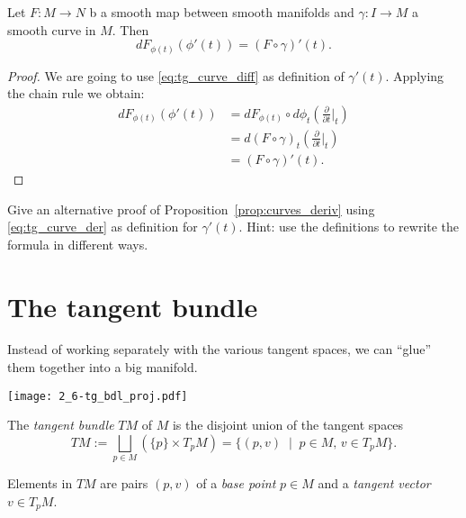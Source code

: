 \begin{proposition}\label{prop:curves_deriv}
  Let $F:M\to N$ b a smooth map between smooth manifolds and $\gamma:I\to M$ a smooth curve in $M$.
  Then
  \begin{equation}
    d F_{\phi(t)} (\phi'(t)) = (F\circ\gamma)'(t).
  \end{equation}
\end{proposition}
\begin{proof}
  We are going to use \eqref{eq:tg_curve_diff} as definition of $\gamma'(t)$.
  Applying the chain rule we obtain:
  \begin{align}
    d F_{\phi(t)} (\phi'(t))
    &= d F_{\phi(t)} \circ d\phi_t \left(\frac{\partial}{\partial t}\Big|_t\right) \\
    &= d (F\circ\gamma)_t \left(\frac{\partial}{\partial t}\Big|_t\right) \\
    &= (F\circ\gamma)'(t).
  \end{align}
\end{proof}

\begin{exercise}
  Give an alternative proof of Proposition~\ref{prop:curves_deriv} using \eqref{eq:tg_curve_der} as definition for $\gamma'(t)$.
  Hint: use the definitions to rewrite the formula in different ways.
\end{exercise}

\section{The tangent bundle}

Instead of working separately with the various tangent spaces, we can ``glue'' them together into a big manifold.

\begin{marginfigure}
  \texttt{[image: 2\_6-tg\_bdl\_proj.pdf]}
\end{marginfigure}
\begin{definition}
  The \emph{tangent bundle} $TM$ of $M$ is the disjoint union of the tangent spaces
  \begin{equation}
    TM := \bigsqcup_{p\in M}\left(\{p\}\times T_pM\right)
       = \{(p,v) \;\mid\; p\in M,\, v\in T_pM\}.
  \end{equation}  
\end{definition}

Elements in $TM$ are pairs $(p,v)$ of a \emph{base point} $p\in M$ and a \emph{tangent vector} $v\in T_pM$.

